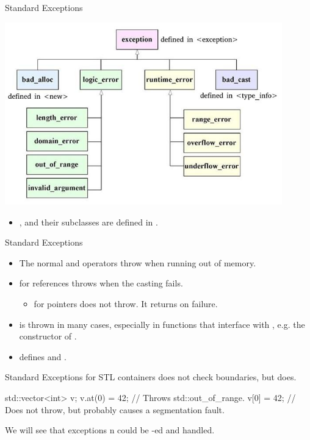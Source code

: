 \documentclass{beamer}
\begin{document}
\begin{frame}{Standard Exceptions}
  \begin{center}
    \includegraphics[width=0.9\textwidth]{img/ExceptionClasses.jpg}
  \end{center}
  \begin{itemize}
    \item {},  and their subclasses are defined in .
  \end{itemize}
\end{frame}

\begin{frame}{Standard Exceptions}
  \begin{itemize}
    \item The normal  and \ttt{[]} operators throw  when running out of memory.
    \item {} for references throws  when the casting fails.
    \begin{itemize}
        \item {} for pointers does not throw. It returns  on failure.
    \end{itemize}
    \pause
    \item {} is thrown in many cases, especially in functions that interface with , e.g. the constructor of .
    \item {} defines  and .
  \end{itemize}
\end{frame}

\begin{frame}[fragile]{Standard Exceptions}
   for STL containers does not check boundaries, but  does.
  \begin{cpp}
std::vector<int> v;
v.at(0) = 42; // Throws std::out_of_range.
v[0] = 42; // Does not throw, but probably causes a segmentation fault.
  \end{cpp}
  We will see that exceptions n could be -ed and handled.
\end{frame}
\end{document}
